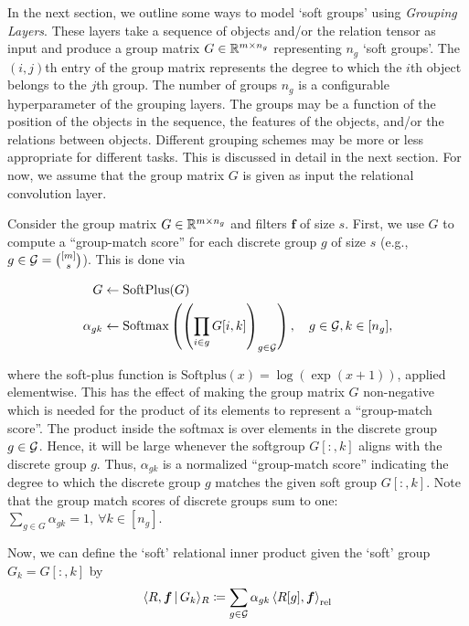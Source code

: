 In the next section, we outline some ways to model `soft groups' using \textit{Grouping Layers}. These layers take a sequence of objects and/or the relation tensor as input and produce a group matrix $G \in \mathbb{R}^{m \times n_g}$ representing $n_g$ `soft groups'. The $(i,j)$th entry of the group matrix represents the degree to which the $i$th object belongs to the $j$th group. The number of groups $n_g$ is a configurable hyperparameter of the grouping layers. The groups may be a function of the position of the objects in the sequence, the features of the objects, and/or the relations between objects. Different grouping schemes may be more or less appropriate for different tasks. This is discussed in detail in the next section. For now, we assume that the group matrix $G$ is given as input the relational convolution layer.

Consider the group matrix $G \in \mathbb{R}^{m \times n_g}$ and filters $\bm{f}$ of size $s$. First, we use $G$ to compute a ``group-match score'' for each discrete group $g$ of size $s$ (e.g., $g \in {\mathcal{G}} = \binom{[m]}{s}$). This is done via

\begin{equation}
    \label{eq:group_match_score}
    \begin{split}
        G &\gets \text{SoftPlus}(G)\\
        \alpha_{gk} &\gets \text{Softmax}\left(\left(\prod_{i \in g} G[i,k]\right)_{g \in {\mathcal{G}}}\right), \quad g \in {\mathcal{G}}, k \in [n_g],
    \end{split}
\end{equation}

where the soft-plus function is $\text{Softplus}(x) = \log(\exp(x + 1))$, applied elementwise. This has the effect of making the group matrix $G$ non-negative which is needed for the product of its elements to represent a ``group-match score''. The product inside the softmax is over elements in the discrete group $g \in {\mathcal{G}}$. Hence, it will be large whenever the softgroup $G[:, k]$ aligns with the discrete group $g$. Thus, $\alpha_{gk}$ is a normalized ``group-match score'' indicating the degree to which the discrete group $g$ matches the given soft group $G[:,k]$. Note that the group match scores of discrete groups sum to one: $\sum_{g \in G} \alpha_{gk} = 1, \ \forall k \in [n_g]$.


Now, we can define the `soft' relational inner product given the `soft' group $G_k = G[:, k]$ by
\begin{equation}
    \label{eq:soft_relational_inner_prod}
    \langle R, \boldsymbol{f} \, \vert \, G_k \rangle_R \coloneqq \sum_{g \in {\mathcal{G}}} \alpha_{gk} \left \langle R[g], \boldsymbol{f} \right\rangle_\mathrm{rel}
\end{equation}

